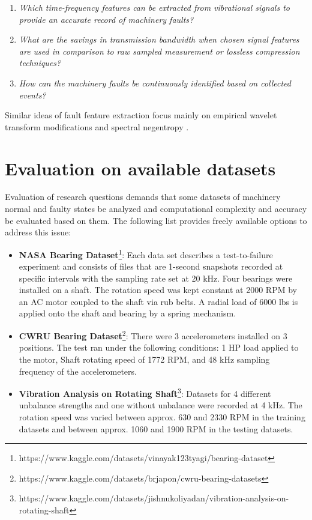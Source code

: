\documentclass[11pt, a4paper, english]{article}
\begin{document}
\begin{refsection}
\begin{enumerate}
\item \emph{Which time-frequency features can be extracted from vibrational signals to provide an accurate record of machinery faults?}
\item \emph{What are the savings in transmission bandwidth when chosen signal features are used in comparison to raw sampled measurement or lossless compression techniques?}
\item \emph{How can the machinery faults be continuously identified based on collected events?}
\end{enumerate}

Similar ideas of fault feature extraction focus mainly on empirical wavelet transform modifications \cite{li_fault_2019} and spectral negentropy \cite{xu_adaptive_2019}.


\section{Evaluation on available datasets}
Evaluation of research questions demands that some datasets of machinery normal and faulty states be analyzed and computational complexity and accuracy be evaluated based on them. The following list provides freely available options to address this issue: 
\begin{itemize}
	\item \textbf{NASA Bearing Dataset}\footnote{https://www.kaggle.com/datasets/vinayak123tyagi/bearing-dataset}:  Each data set describes a test-to-failure experiment and consists of files that are 1-second snapshots recorded at specific intervals with the sampling rate set at 20 kHz. Four bearings were installed on a shaft. The rotation speed was kept constant at 2000 RPM by an AC motor coupled to the shaft via rub belts. A radial load of 6000 lbs is applied onto the shaft and bearing by a spring mechanism. 	\item \textbf{CWRU Bearing Dataset}\footnote{https://www.kaggle.com/datasets/brjapon/cwru-bearing-datasets}: There were 3 accelerometers installed on 3 positions. The test ran under the following conditions: 1 HP load applied to the motor, Shaft rotating speed of 1772 RPM, and 48 kHz sampling frequency of the accelerometers.
	\item \textbf{Vibration Analysis on Rotating Shaft}\footnote{https://www.kaggle.com/datasets/jishnukoliyadan/vibration-analysis-on-rotating-shaft}: Datasets for 4 different unbalance strengths and one without unbalance were recorded at 4 kHz. The rotation speed was varied between approx. 630 and 2330 RPM in the training datasets and between approx. 1060 and 1900 RPM in the testing datasets.
\end{itemize}


\end{refsection}
\end{document}
